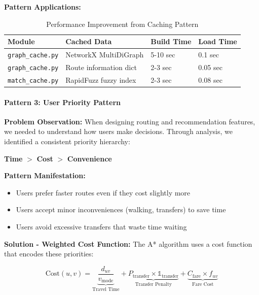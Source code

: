 \textbf{Pattern Applications:}
\begin{table}[H]
    \centering
    \renewcommand{\arraystretch}{1.2}
    \begin{tabularx}{\textwidth}{|l|l|X|l|}
        \hline
        \textbf{Module} & \textbf{Cached Data} & \textbf{Build Time} & \textbf{Load Time} \\
        \hline
        \texttt{graph\_cache.py} & NetworkX MultiDiGraph & 5-10 sec & 0.1 sec \\
        \hline
        \texttt{graph\_cache.py} & Route information dict & 2-3 sec & 0.05 sec \\
        \hline
        \texttt{match\_cache.py} & RapidFuzz fuzzy index & 2-3 sec & 0.08 sec \\
        \hline
    \end{tabularx}
    \caption{Performance Improvement from Caching Pattern}
\end{table}

\paragraph{Pattern 3: User Priority Pattern} 
\textbf{Problem Observation:} When designing routing and recommendation features, we needed to understand how users make decisions. Through analysis, we identified a consistent priority hierarchy:

\begin{center}
\textbf{Time} $>$ \textbf{Cost} $>$ \textbf{Convenience}
\end{center}

\textbf{Pattern Manifestation:}
\begin{itemize}[noitemsep]
    \item Users prefer faster routes even if they cost slightly more
    \item Users accept minor inconveniences (walking, transfers) to save time
    \item Users avoid excessive transfers that waste time waiting
\end{itemize}

\textbf{Solution - Weighted Cost Function:}
The A* algorithm uses a cost function that encodes these priorities:

\begin{equation}
    \text{Cost}(u, v) = \underbrace{\frac{d_{uv}}{v_{\text{mode}}}}_{\text{Travel Time}} + \underbrace{P_{\text{transfer}} \times \mathbb{1}_{\text{transfer}}}_{\text{Transfer Penalty}} + \underbrace{C_{\text{fare}} \times f_{uv}}_{\text{Fare Cost}}
\end{equation}

